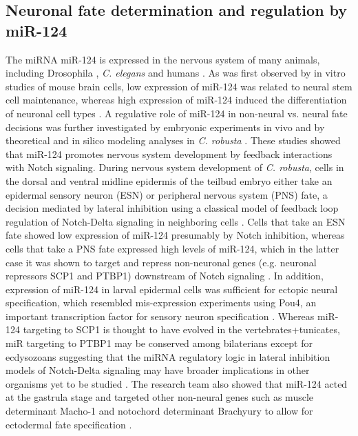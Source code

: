 \documentclass[graybox]{svmult}
\begin{document}
\subsection{Neuronal fate determination and regulation by miR-124}

The miRNA miR-124 is expressed in the nervous system of many animals, including 
Drosophila \cite{Aboobaker18017}, \textit{C. elegans} \cite{Clark:2010} and 
humans \cite{Sempere2004}. As was first observed by in vitro studies of mouse 
brain cells, low expression of miR-124 was related to neural stem cell 
maintenance, whereas high expression of miR-124 induced the differentiation of 
neuronal cell types \cite{Cheng:2009qf}. A regulative role of 
miR-124 in non-neural vs. neural fate decisions was further investigated by 
embryonic experiments in vivo \cite{Chen4943} and by 
theoretical and in silico modeling analyses in \textit{C. robusta} 
\cite{Chen2014}. These studies showed that miR-124 promotes 
nervous system development by feedback interactions with Notch signaling. 
During nervous system development of \textit{C. robusta}, cells in the dorsal 
and ventral midline epidermis of the teilbud embryo either take an epidermal 
sensory neuron (ESN) or peripheral nervous system (PNS) fate, a decision 
mediated by lateral inhibition using a classical model of feedback loop 
regulation of Notch-Delta signaling in neighboring cells \cite{Collier:1996, 
Chen2014}. Cells that take an ESN fate showed low expression of miR-124 
presumably by Notch inhibition, whereas cells that take a PNS fate expressed 
high levels of miR-124, which in the latter case it was shown to target and 
repress non-neuronal genes (e.g. neuronal repressors SCP1 and PTBP1) downstream 
of Notch signaling \cite{Chen4943}. In addition, expression 
of miR-124 in larval epidermal cells was sufficient for ectopic neural 
specification, which resembled mis-expression experiments using Pou4, an 
important transcription factor for sensory neuron specification 
\cite{Chen4943, JoyceTang2013}. Whereas miR-124 targeting to SCP1 is thought to 
have evolved in the vertebrates+tunicates, miR targeting to PTBP1 may be 
conserved among bilaterians except for ecdysozoans \cite{Chen4943} suggesting 
that the miRNA regulatory logic in lateral inhibition models of Notch-Delta 
signaling may have broader implications in other organisms yet to be studied 
\cite{Chen2014}. The research team also showed that miR-124 
acted at the gastrula stage and targeted other non-neural genes such as muscle 
determinant Macho-1 and notochord determinant Brachyury to allow for ectodermal 
fate specification \cite{Chen4943}.
\end{document}
